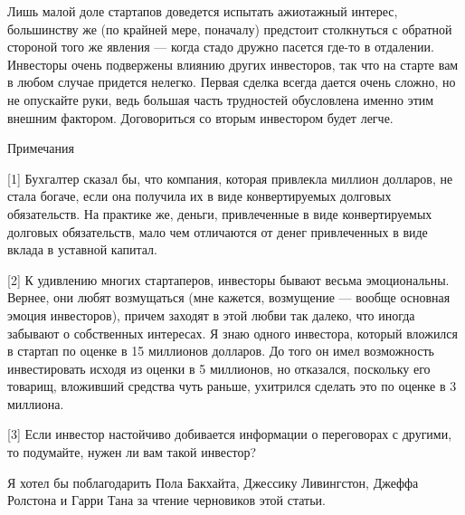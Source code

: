 \documentclass[ebook,12pt,oneside,openany]{memoir}
\begin{document}
Лишь малой доле стартапов доведется испытать ажиотажный интерес,
большинству же (по крайней мере, поначалу) предстоит столкнуться с
обратной стороной того же явления — когда стадо дружно пасется где-то
в отдалении. Инвесторы очень подвержены влиянию других инвесторов, так
что на старте вам в любом случае придется нелегко. Первая сделка
всегда дается очень сложно, но не опускайте руки, ведь большая часть
трудностей обусловлена именно этим внешним фактором. Договориться со
вторым инвестором будет легче.

Примечания

[1] Бухгалтер сказал бы, что компания, которая привлекла миллион
долларов, не стала богаче, если она получила их в виде конвертируемых
долговых обязательств. На практике же, деньги, привлеченные в виде
конвертируемых долговых обязательств, мало чем отличаются от денег
привлеченных в виде вклада в уставной капитал.

[2] К удивлению многих стартаперов, инвесторы бывают весьма
эмоциональны. Вернее, они любят возмущаться (мне кажется, возмущение —
вообще основная эмоция инвесторов), причем заходят в этой любви так
далеко, что иногда забывают о собственных интересах. Я знаю одного
инвестора, который вложился в стартап по оценке в 15 миллионов
долларов. До того он имел возможность инвестировать исходя из оценки в
5 миллионов, но отказался, поскольку его товарищ, вложивший средства
чуть раньше, ухитрился сделать это по оценке в 3 миллиона.

[3] Если инвестор настойчиво добивается информации о переговорах с
другими, то подумайте, нужен ли вам такой инвестор?

Я хотел бы поблагодарить Пола Бакхайта, Джессику Ливингстон, Джеффа
Ролстона и Гарри Тана за чтение черновиков этой статьи.
\end{document}
